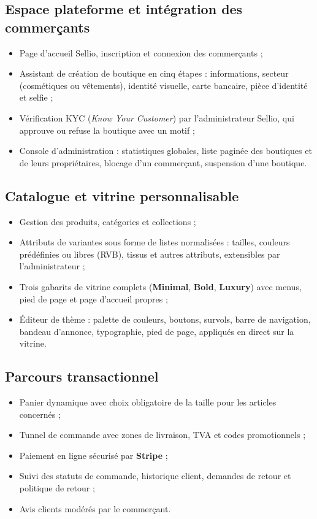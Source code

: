 \subsection{Espace plateforme et intégration des commerçants}
\begin{itemize}
    \item Page d'accueil Sellio, inscription et connexion des commerçants ;
    \item Assistant de création de boutique en cinq étapes : informations, secteur (cosmétiques ou vêtements), identité visuelle, carte bancaire, pièce d'identité et selfie ;
    \item Vérification KYC (\textit{Know Your Customer}) par l'administrateur Sellio, qui approuve ou refuse la boutique avec un motif ;
    \item Console d'administration : statistiques globales, liste paginée des boutiques et de leurs propriétaires, blocage d'un commerçant, suspension d'une boutique.
\end{itemize}

\subsection{Catalogue et vitrine personnalisable}
\begin{itemize}
    \item Gestion des produits, catégories et collections ;
    \item Attributs de variantes sous forme de listes normalisées : tailles, couleurs prédéfinies ou libres (RVB), tissus et autres attributs, extensibles par l'administrateur ;
    \item Trois gabarits de vitrine complets (\textbf{Minimal}, \textbf{Bold}, \textbf{Luxury}) avec menus, pied de page et page d'accueil propres ;
    \item Éditeur de thème : palette de couleurs, boutons, survols, barre de navigation, bandeau d'annonce, typographie, pied de page, appliqués en direct sur la vitrine.
\end{itemize}

\subsection{Parcours transactionnel}
\begin{itemize}
    \item Panier dynamique avec choix obligatoire de la taille pour les articles concernés ;
    \item Tunnel de commande avec zones de livraison, TVA et codes promotionnels ;
    \item Paiement en ligne sécurisé par \textbf{Stripe} ;
    \item Suivi des statuts de commande, historique client, demandes de retour et politique de retour ;
    \item Avis clients modérés par le commerçant.
\end{itemize}

